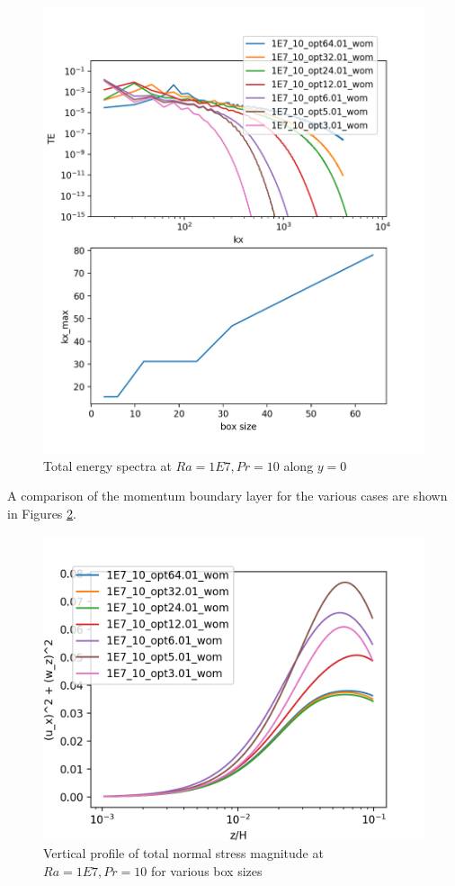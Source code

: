 \documentclass[12pt]{article}
\begin{document}
      \begin{figure}[!htb]
      	\includegraphics[width=\linewidth]{TE_1E7_10.png}
      	\caption{ Total energy spectra at $Ra = 1E7, Pr =10$ along $y = 0$}
      	\label{fig:fig27}
      \end{figure}
     
     A comparison of the momentum boundary layer for the various cases are shown in Figures \ref{fig:fig28}.  
     
     \begin{figure}[!htb]
     	\includegraphics[width=\linewidth]{BL_1E7_10.png}
     	\caption{ Vertical profile of total normal stress magnitude at $Ra = 1E7, Pr =10$ for various box sizes}
     	\label{fig:fig28}
     \end{figure}
    
\end{document}
